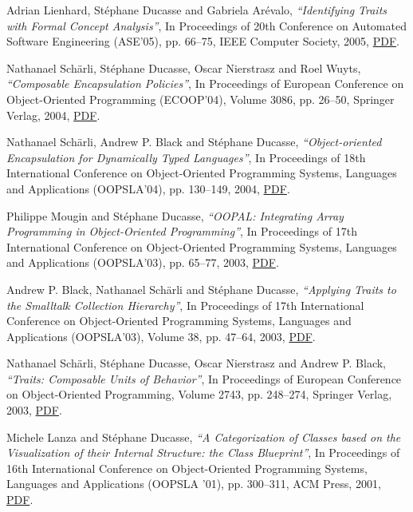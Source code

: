 \documentclass{article}
\newcommand{\czauthors}[1]{#1}
\newcommand{\cztitle}[1]{\emph{``#1''}}
\newcommand{\czbooktitle}[1]{#1}
\begin{document}
\begin{itemize}
	\pub  \czauthors{Adrian Lienhard, St\'ephane Ducasse and Gabriela Ar{\'e}valo},  \cztitle{Identifying Traits with Formal Concept Analysis},  In \czbooktitle{Proceedings of 20th Conference on Automated Software Engineering (ASE'05)}, pp. 66--75, IEEE Computer Society, 2005, \href{http://rmod-files.lille.inria.fr/Team/Texts/Papers/Lien05aIdentifyingTraits.pdf}{PDF}.

	\pub  \czauthors{Nathanael Sch\"arli, St\'ephane Ducasse, Oscar Nierstrasz and Roel Wuyts},  \cztitle{Composable Encapsulation Policies},  In \czbooktitle{Proceedings of European Conference on Object-Oriented Programming (ECOOP'04)}, Volume 3086, pp. 26--50, Springer Verlag, 2004, \href{http://rmod-files.lille.inria.fr/Team/Texts/Papers/Scha04a-ECOOP-EncapsulationPolicies.pdf}{PDF}.

	\pub  \czauthors{Nathanael Sch\"arli, Andrew P. Black and St\'ephane Ducasse},  \cztitle{Object-oriented Encapsulation for Dynamically Typed Languages},  In \czbooktitle{Proceedings of 18th International Conference on Object-Oriented Programming Systems, Languages and Applications (OOPSLA'04)}, pp. 130--149, 2004, \href{http://rmod-files.lille.inria.fr/Team/Texts/Papers/Scha04b-OOPSLA-OOEncapsulation.pdf}{PDF}.

	\pub  \czauthors{Philippe Mougin and St\'ephane Ducasse},  \cztitle{{OOPAL}: Integrating Array Programming in Object-Oriented Programming},  In \czbooktitle{Proceedings of 17th International Conference on Object-Oriented Programming Systems, Languages and Applications (OOPSLA'03)}, pp. 65--77, 2003, \href{http://rmod-files.lille.inria.fr/Team/Texts/Papers/Moug03aOOPALOOPSLA.pdf}{PDF}.

	\pub  \czauthors{Andrew P. Black, Nathanael Sch\"arli and St\'ephane Ducasse},  \cztitle{Applying Traits to the {Smalltalk} Collection Hierarchy},  In \czbooktitle{Proceedings of 17th International Conference on Object-Oriented Programming Systems, Languages and Applications (OOPSLA'03)}, Volume 38, pp. 47--64, 2003, \href{http://rmod-files.lille.inria.fr/Team/Texts/Papers/Blac03a-OOSPLA03-TraitsHierarchy.pdf}{PDF}.

	\pub  \czauthors{Nathanael Sch\"arli, St\'ephane Ducasse, Oscar Nierstrasz and Andrew P. Black},  \cztitle{Traits: Composable Units of Behavior},  In \czbooktitle{Proceedings of European Conference on Object-Oriented Programming}, Volume 2743, pp. 248--274, Springer Verlag, 2003, \href{http://rmod-files.lille.inria.fr/Team/Texts/Papers/Scha03a-ECOOP-Traits.pdf}{PDF}.

	\pub  \czauthors{Michele Lanza and St\'ephane Ducasse},  \cztitle{A {Categorization} of {Classes} based on the {Visualization} of their {Internal} {Structure}: the {Class} {Blueprint}},  In \czbooktitle{Proceedings of 16th International Conference on Object-Oriented Programming Systems, Languages and Applications (OOPSLA '01)}, pp. 300--311, ACM Press, 2001, \href{http://rmod-files.lille.inria.fr/Team/Texts/Papers/Lanz01bClassBlueprint.pdf}{PDF}.


\end{itemize}
\end{document}

